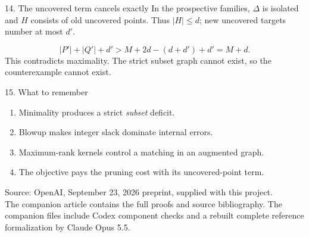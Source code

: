 \documentclass[aspectratio=169,11pt]{beamer}
\begin{document}
\begin{frame}{14. The uncovered term cancels exactly}
\small
In the prospective families, $\Delta$ is isolated and $H$ consists of old
uncovered points. Thus $|H|\le d$; new uncovered targets number at most $d'$.
\begin{center}\end{center}
\[
|P'|+|Q'|+d'
>M+2d-(d+d')+d'=M+d.
\]
This contradicts maximality. The strict subset graph cannot exist,
so the counterexample cannot exist.
\end{frame}

\begin{frame}{15. What to remember}
\begin{enumerate}
\item Minimality produces a strict \emph{subset} deficit.
\item Blowup makes integer slack dominate internal errors.
\item Maximum-rank kernels control a matching in an augmented graph.
\item The objective pays the pruning cost with its uncovered-point term.
\end{enumerate}
\medskip
\small
Source: OpenAI, September 23, 2026 preprint, supplied with this project.\\
The companion article contains the full proofs and source bibliography.
The companion files include Codex component checks and a rebuilt complete
reference formalization by Claude Opus 5.5.
\end{frame}
\end{document}
